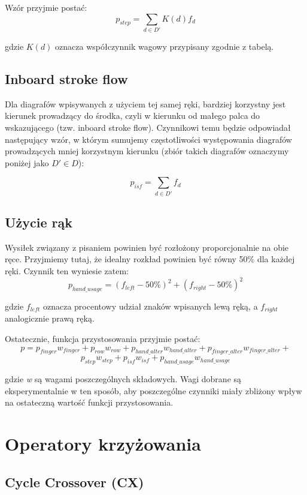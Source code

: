 \documentclass[brudnopis]{xmgr}
\begin{document}
Wzór przyjmie postać:
$$ p_{step} = \sum\limits_{d \in D'} K(d) f_d $$

gdzie $K(d)$ oznacza współczynnik wagowy przypisany zgodnie z tabelą.


\subsection{Inboard stroke flow}

Dla diagrafów wpisywanych z użyciem tej samej ręki, bardziej korzystny jest kierunek prowadzący do środka, czyli w kierunku od małego palca do wskazującego (tzw. inboard stroke flow). Czynnikowi temu będzie odpowiadał następujący wzór, w którym sumujemy częstotliwości występowania diagrafów prowadzących mniej korzystnym kierunku (zbiór takich diagrafów oznaczymy poniżej jako $ D' \in D $):

$$ p_{isf} = \sum\limits_{d \in D'} f_d $$


\subsection{Użycie rąk}

Wysiłek związany z pisaniem powinien być rozłożony proporcjonalnie na obie ręce. Przyjmiemy tutaj, że idealny rozkład powinien być równy 50\% dla każdej ręki. Czynnik ten wyniesie zatem:
$$ p_{hand\_usage} = (f_{left} - 50\%)^2 + (f_{right} - 50\%)^2 $$

gdzie $f_{left}$ oznacza procentowy udział znaków wpisanych lewą ręką, a $f_{right}$ analogicznie prawą ręką.\newline\newline


\noindent Ostatecznie, funkcja przystosowania przyjmie postać:
$$ p = p_{finger} w_{finger} + p_{row} w_{row} + p_{hand\_alter} w_{hand\_alter} + p_{finger\_alter} w_{finger\_alter} + $$
$$ p_{step} w_{step} + p_{isf} w_{isf} + p_{hand\_usage} w_{hand\_usage} $$

\noindent
gdzie \emph{w} są wagami poszczególnych składowych. Wagi dobrane są eksperymentalnie w ten sposób, aby poszczególne czynniki miały zbliżony wpływ na ostateczną wartość funkcji przystosowania.


\section{Operatory krzyżowania}

\subsection{Cycle Crossover (CX)}
\end{document}
